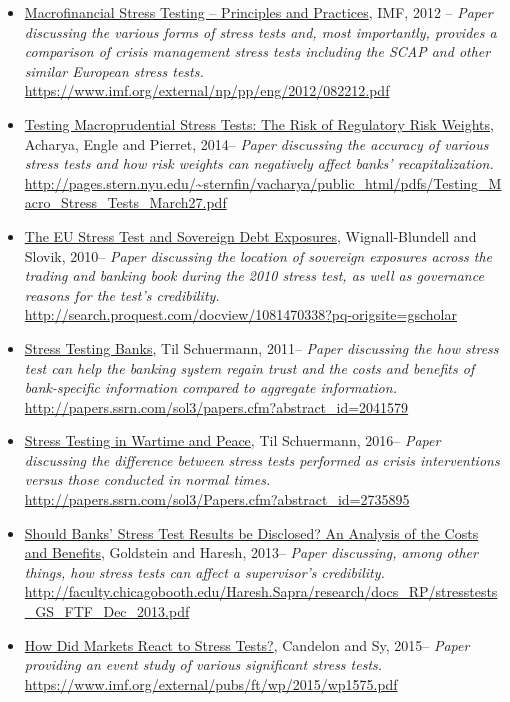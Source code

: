 \documentclass[12pt]{article}
\begin{document}
\begin{itemize}
\item
\ul{Macrofinancial Stress Testing -- Principles and Practices},
 IMF, 2012 -- \emph{Paper discussing the various forms of stress tests and, most importantly, provides a comparison of crisis management stress tests including the SCAP and other similar European stress tests.} \url{https://www.imf.org/external/np/pp/eng/2012/082212.pdf}
\item
\ul{Testing Macroprudential Stress Tests: The Risk of Regulatory Risk Weights},
Acharya, Engle and Pierret, 2014-- \emph{Paper discussing the accuracy of various stress tests and how risk weights can negatively affect banks' recapitalization.} \url{http://pages.stern.nyu.edu/~sternfin/vacharya/public_html/pdfs/Testing_Macro_Stress_Tests_March27.pdf}
\item
\ul{The EU Stress Test and Sovereign Debt Exposures},
Wignall-Blundell and Slovik, 2010-- \emph{Paper discussing the location of sovereign exposures across the trading and banking book during the 2010 stress test, as well as governance reasons for the test's credibility.} \url{http://search.proquest.com/docview/1081470338?pq-origsite=gscholar}
\item
\ul{Stress Testing Banks},
Til Schuermann, 2011-- \emph{Paper discussing the how stress test can help the banking system regain trust and the costs and benefits of bank-specific information compared to aggregate information.} \url{http://papers.ssrn.com/sol3/papers.cfm?abstract_id=2041579}
\item
\ul{Stress Testing in Wartime and Peace},
Til Schuermann, 2016-- \emph{Paper discussing the difference between stress tests performed as crisis interventions versus those conducted in normal times.} \url{http://papers.ssrn.com/sol3/Papers.cfm?abstract_id=2735895}
\item
\ul{Should Banks' Stress Test Results be Disclosed? An Analysis of the Costs and Benefits},
Goldstein and Haresh, 2013-- \emph{Paper discussing, among other things, how stress tests can affect a supervisor's credibility.} \url{http://faculty.chicagobooth.edu/Haresh.Sapra/research/docs_RP/stresstests_GS_FTF_Dec_2013.pdf}
\item
\ul{How Did Markets React to Stress Tests?},
Candelon and Sy, 2015-- \emph{Paper providing an event study of various significant stress tests.} \url{https://www.imf.org/external/pubs/ft/wp/2015/wp1575.pdf}

\end{itemize}
\end{document}
